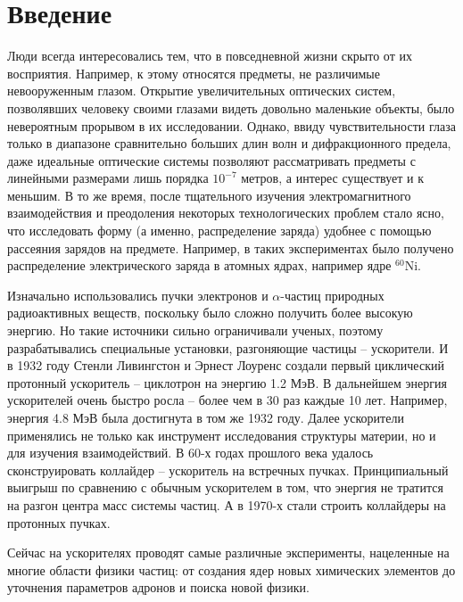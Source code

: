 \documentclass[12pt, a4paper]{article}
\begin{document}



\section{Введение}

Люди всегда интересовались тем, что в повседневной жизни скрыто от их восприятия. Например, к этому относятся предметы, не различимые невооруженным глазом. Открытие увеличительных оптических систем, позволявших человеку своими глазами видеть довольно маленькие объекты, было невероятным прорывом в их исследовании. Однако, ввиду чувствительности глаза только в диапазоне сравнительно больших длин волн и дифракционного предела, даже идеальные оптические системы позволяют рассматривать предметы с линейными размерами лишь порядка $10^{-7}$ метров, а интерес существует и к меньшим. 
В то же время, после тщательного изучения электромагнитного взаимодействия и преодоления некоторых технологических проблем стало ясно, что исследовать форму (а именно, распределение заряда) удобнее с помощью рассеяния зарядов на предмете. Например, в таких экспериментах \cite{Ni-60_charge} было получено распределение электрического заряда в атомных ядрах, например ядре $^{60}$Ni.

Изначально использовались пучки электронов и $\alpha$-частиц природных радиоактивных веществ, поскольку было сложно получить более высокую энергию. Но такие источники сильно ограничивали ученых, поэтому разрабатывались специальные установки, разгоняющие частицы -- ускорители. И в 1932 году Стенли Ливингстон и Эрнест Лоуренс создали первый циклический протонный ускоритель -- циклотрон на энергию 1.2 МэВ. В дальнейшем энергия ускорителей очень быстро росла -- более чем в 30 раз каждые 10 лет. Например, энергия 4.8 МэВ была достигнута в том же 1932 году. Далее ускорители применялись не только как инструмент исследования структуры материи, но и для изучения взаимодействий. В 60-х годах прошлого века удалось сконструировать коллайдер -- ускоритель на встречных пучках. Принципиальный выигрыш по сравнению с обычным ускорителем в том, что энергия не тратится на разгон центра масс системы частиц. А в 1970-х стали строить коллайдеры на протонных пучках. 

Сейчас на ускорителях проводят самые различные эксперименты, нацеленные на многие области физики частиц: от создания ядер новых химических элементов до уточнения параметров адронов и поиска новой физики.
\end{document}
